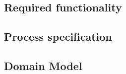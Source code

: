\documentclass[a4paper,12pt]{report}
\begin{document}
\subsection{Required functionality}
\subsection{Process specification}
\subsection{Domain Model}

\newpage


{} %

\end{document}
